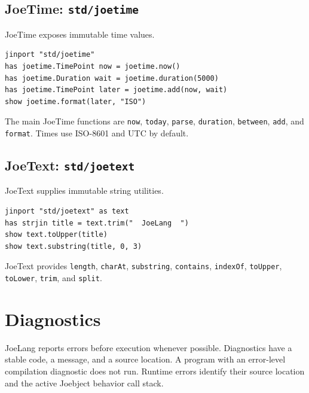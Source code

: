 \documentclass[11pt]{article}
\newcommand{\keyword}[1]{\texttt{#1}}
\begin{document}
\subsection{JoeTime: \keyword{std/joetime}}
JoeTime exposes immutable time values.
\begin{lstlisting}
jinport "std/joetime"
has joetime.TimePoint now = joetime.now()
has joetime.Duration wait = joetime.duration(5000)
has joetime.TimePoint later = joetime.add(now, wait)
show joetime.format(later, "ISO")
\end{lstlisting}
The main JoeTime functions are \keyword{now}, \keyword{today}, \keyword{parse}, \keyword{duration}, \keyword{between}, \keyword{add}, and \keyword{format}. Times use ISO-8601 and UTC by default.

\subsection{JoeText: \keyword{std/joetext}}
JoeText supplies immutable string utilities.
\begin{lstlisting}
jinport "std/joetext" as text
has strjin title = text.trim("  JoeLang  ")
show text.toUpper(title)
show text.substring(title, 0, 3)
\end{lstlisting}
JoeText provides \keyword{length}, \keyword{charAt}, \keyword{substring}, \keyword{contains}, \keyword{indexOf}, \keyword{toUpper}, \keyword{toLower}, \keyword{trim}, and \keyword{split}.

\section{Diagnostics}
JoeLang reports errors before execution whenever possible. Diagnostics have a stable code, a message, and a source location. A program with an error-level compilation diagnostic does not run. Runtime errors identify their source location and the active Joebject behavior call stack.
\end{document}
